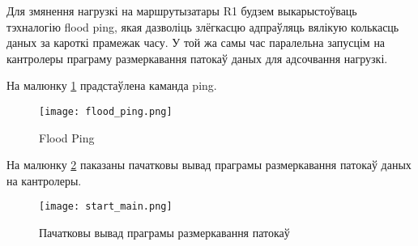 Для змянення нагрузкі на маршрутызатары R1 будзем выкарыстоўваць тэхналогію flood ping,
якая дазволіць злёгкасцю адпраўляць вялікую колькасць даных за кароткі прамежак часу.
У той жа самы час паралельна запусцім на кантролеры праграму размеркавання патокаў даных для адсочвання нагрузкі.

На малюнку \ref{img: flood ping} прадстаўлена каманда ping.

\begin{figure}[h!]
    \centering
    \texttt{[image: flood\_ping.png]}
    \caption{Flood Ping}
    \label{img: flood ping} 
\end{figure}

На малюнку \ref{img: start main} паказаны пачатковы вывад праграмы размеркавання патокаў даных на кантролеры.

\begin{figure}[h!]
    \centering
    \texttt{[image: start\_main.png]}
    \caption{Пачатковы вывад праграмы размеркавання патокаў}
    \label{img: start main} 
\end{figure}

